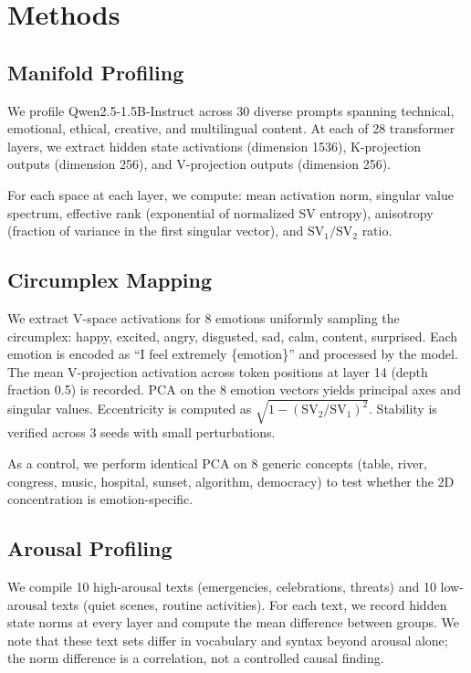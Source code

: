 \documentclass[11pt,a4paper]{article}
\begin{document}
\section{Methods}

\subsection{Manifold Profiling}

We profile Qwen2.5-1.5B-Instruct across 30 diverse prompts spanning technical, emotional, ethical, creative, and multilingual content. At each of 28 transformer layers, we extract hidden state activations (dimension 1536), K-projection outputs (dimension 256), and V-projection outputs (dimension 256).

For each space at each layer, we compute: mean activation norm, singular value spectrum, effective rank (exponential of normalized SV entropy), anisotropy (fraction of variance in the first singular vector), and $\text{SV}_1/\text{SV}_2$ ratio.

\subsection{Circumplex Mapping}

We extract V-space activations for 8 emotions uniformly sampling the circumplex: happy, excited, angry, disgusted, sad, calm, content, surprised. Each emotion is encoded as ``I feel extremely \{emotion\}'' and processed by the model. The mean V-projection activation across token positions at layer 14 (depth fraction 0.5) is recorded. PCA on the 8 emotion vectors yields principal axes and singular values. Eccentricity is computed as $\sqrt{1 - (\text{SV}_2/\text{SV}_1)^2}$. Stability is verified across 3 seeds with small perturbations.

As a control, we perform identical PCA on 8 generic concepts (table, river, congress, music, hospital, sunset, algorithm, democracy) to test whether the 2D concentration is emotion-specific.

\subsection{Arousal Profiling}

We compile 10 high-arousal texts (emergencies, celebrations, threats) and 10 low-arousal texts (quiet scenes, routine activities). For each text, we record hidden state norms at every layer and compute the mean difference between groups. We note that these text sets differ in vocabulary and syntax beyond arousal alone; the norm difference is a correlation, not a controlled causal finding.
\end{document}
